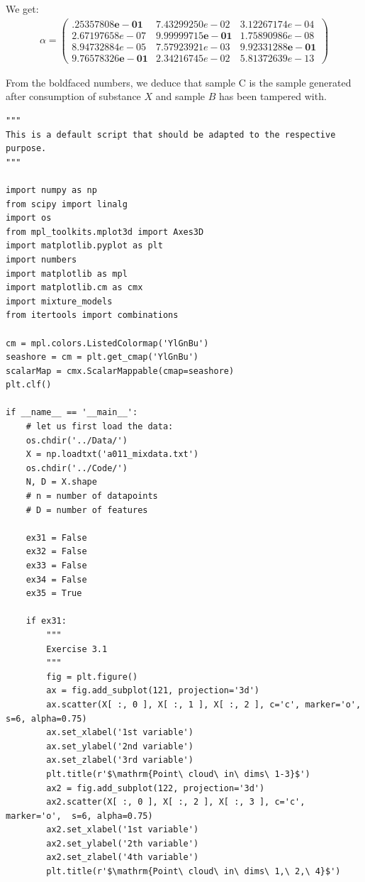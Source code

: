 We get: 
\begin{align}
	\alpha = 
	\begin{pmatrix}
	\mathbf{ .25357808e-01} &   7.43299250e-02 &  3.12267174e-04 \\
	2.67197658e-07 &   \mathbf{9.99999715e-01} &  1.75890986e-08 \\
	8.94732884e-05 &   7.57923921e-03 &  \mathbf{9.92331288e-01} \\
	\mathbf{9.76578326e-01} &   2.34216745e-02 &  5.81372639e-13
	\end{pmatrix}
\end{align}

From the boldfaced numbers, we deduce that sample C is the sample generated after consumption of substance $X$ and sample $B$ has been tampered with.

\newpage
\begin{verbatim}
"""
This is a default script that should be adapted to the respective purpose.
"""

import numpy as np
from scipy import linalg
import os
from mpl_toolkits.mplot3d import Axes3D
import matplotlib.pyplot as plt
import numbers
import matplotlib as mpl
import matplotlib.cm as cmx
import mixture_models
from itertools import combinations

cm = mpl.colors.ListedColormap('YlGnBu')
seashore = cm = plt.get_cmap('YlGnBu')
scalarMap = cmx.ScalarMappable(cmap=seashore)
plt.clf()

if __name__ == '__main__':
    # let us first load the data:
    os.chdir('../Data/')
    X = np.loadtxt('a011_mixdata.txt')
    os.chdir('../Code/')
    N, D = X.shape
    # n = number of datapoints
    # D = number of features

    ex31 = False
    ex32 = False
    ex33 = False
    ex34 = False
    ex35 = True

    if ex31:
        """
        Exercise 3.1
        """
        fig = plt.figure()
        ax = fig.add_subplot(121, projection='3d')
        ax.scatter(X[ :, 0 ], X[ :, 1 ], X[ :, 2 ], c='c', marker='o',  s=6, alpha=0.75)
        ax.set_xlabel('1st variable')
        ax.set_ylabel('2nd variable')
        ax.set_zlabel('3rd variable')
        plt.title(r'$\mathrm{Point\ cloud\ in\ dims\ 1-3}$')
        ax2 = fig.add_subplot(122, projection='3d')
        ax2.scatter(X[ :, 0 ], X[ :, 2 ], X[ :, 3 ], c='c', marker='o',  s=6, alpha=0.75)
        ax2.set_xlabel('1st variable')
        ax2.set_ylabel('2th variable')
        ax2.set_zlabel('4th variable')
        plt.title(r'$\mathrm{Point\ cloud\ in\ dims\ 1,\ 2,\ 4}$')


\end{verbatim}
